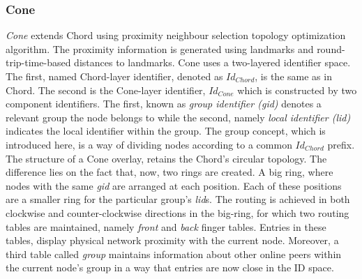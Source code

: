 %
%

\subsubsection{Cone}
\emph{Cone} \cite{wang_cone_2007} extends Chord using proximity neighbour
selection topology optimization algorithm. The proximity information is
generated using landmarks and round-trip-time-based distances to landmarks.
Cone uses a two-layered identifier space. The first, named Chord-layer
identifier, denoted as $Id_{Chord}$, is the same as in Chord. The second is the
Cone-layer identifier, $Id_{Cone}$ which is constructed by two component
identifiers. The first, known as \emph{group identifier (gid)} denotes a
relevant group the node belongs to while the second, namely \emph{local
identifier (lid)} indicates the local identifier within the group. The group
concept, which is introduced here, is a way of dividing nodes according to a
common $Id_{Chord}$ prefix.  The structure of a Cone overlay, retains the
Chord's circular topology. The difference lies on the fact that, now, two rings
are created. A big ring, where nodes with the same \emph{gid} are arranged at
each position. Each of these positions are a smaller ring for the particular
group's \emph{lid}s. The routing is achieved in both clockwise and
counter-clockwise directions in the big-ring, for which two routing tables are
maintained, namely \emph{front} and \emph{back} finger tables. Entries in these
tables, display physical network proximity with the current node. Moreover, a
third table called \emph{group} maintains information about other online peers
within the current node's group in a way that entries are now close in the ID
space.

